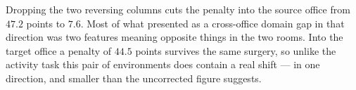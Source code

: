 Dropping the two reversing columns cuts the penalty into the source office from $47.2$
points to $7.6$. Most of what presented as a cross-office domain gap in that direction was
two features meaning opposite things in the two rooms. Into the target office a penalty of
$44.5$ points survives the same surgery, so unlike the activity task this pair of
environments does contain a real shift --- in one direction, and smaller than the
uncorrected figure suggests.
